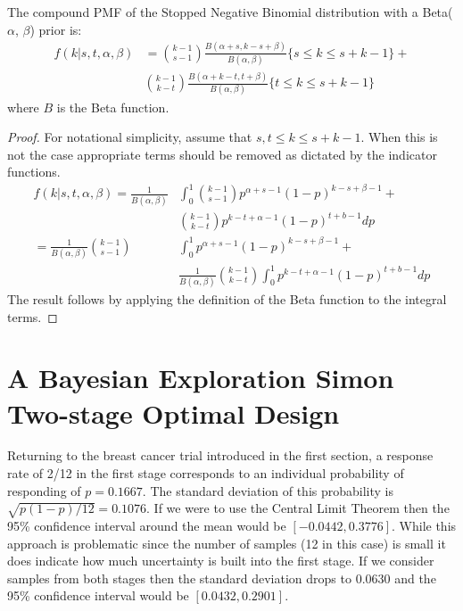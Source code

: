 \documentclass[12pt]{article}         %
\begin{document}
\begin{prop}
The compound PMF of the Stopped Negative Binomial distribution with a Beta($\alpha$, $\beta$) prior is:
\begin{align}
f(k | s, t, \alpha, \beta) &= {k-1 \choose s-1} \frac{B\left(\alpha+s, k-s+\beta \right)}{B(\alpha, \beta)} \{s \leq k \leq s+k-1\} + \nonumber \\
& {k-1 \choose k-t} \frac{B\left(\alpha + k - t, t+\beta\right)}{B(\alpha, \beta)} \{t \leq k \leq s+k-1\}
\end{align}
where $B$ is the Beta function.
\end{prop}
\begin{proof}
For notational simplicity, assume that $s,t \leq k \leq s+k-1$. When this is not the case appropriate terms should be removed as dictated by the indicator functions.
\begin{align*}
f(k | s, t, \alpha, \beta) = \frac{1}{B(\alpha, \beta)} & \int_0^1 {k-1 \choose s-1} p^{\alpha +s -1} \left(1-p\right)^{k-s+\beta-1} + \\
 & {k-1 \choose k-t} p^{k-t+\alpha-1}\left(1-p\right)^{t+b-1} dp \\
= \frac{1}{B(\alpha, \beta)}  {k-1 \choose s-1} & \int_0^1  p^{\alpha +s -1} \left(1-p\right)^{k-s+\beta-1} + \\
 & \frac{1}{B(\alpha, \beta)} {k-1 \choose k-t} \int_0^1  p^{k-t+\alpha-1}\left(1-p\right)^{t+b-1} dp
\end{align*}
The result follows by applying the definition of the Beta function to the integral terms.
\end{proof}

\section{A Bayesian Exploration Simon Two-stage Optimal Design}

Returning to the breast cancer trial introduced in the first section, a 
response rate of 2/12 in the first stage corresponds to an individual 
probability of responding of $p=0.1667$. The standard deviation of this 
probability is $\sqrt{p(1-p)/12}=0.1076$. If we were to use the Central 
Limit Theorem then the 95\% confidence interval around the mean would 
be $[-0.0442, 0.3776]$. While this approach is problematic since the number 
of samples (12 in this case) is small it does indicate how much uncertainty 
is built into the first stage. If we consider samples from both stages then 
the standard deviation drops to 0.0630 and the 95\% confidence interval 
would be $[0.0432, 0.2901]$.
\end{document}
